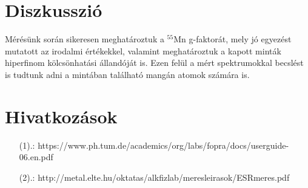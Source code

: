 \documentclass[12pt,a4paper]{article}
\begin{document}
\section{Diszkusszió}
\hspace*{10pt} Mérésünk során sikeresen meghatároztuk a $^{55}$Mn g-faktorát, mely jó egyezést mutatott az irodalmi értékekkel, valamint meghatároztuk a kapott minták hiperfinom kölcsönhatási állandóját is. Ezen felül a mért spektrumokkal becslést is tudtunk adni a mintában található mangán atomok számára is.

\section*{Hivatkozások}
\begin{itemize}
\item[(1).:] {https://www.ph.tum.de/academics/org/labs/fopra/docs/userguide-06.en.pdf}
\item[(2).:] {http://metal.elte.hu/oktatas/alkfizlab/meresleirasok/ESRmeres.pdf}
\end{itemize}
\end{document}
